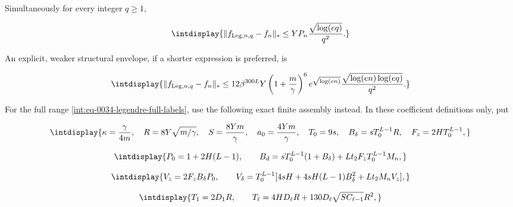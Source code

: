
Simultaneously for every integer \(q\ge1\),


\begingroup\renewcommand{\theHequation}{intdisplay.121}
\begin{equation}
\intdisplay{
\|f_{{\rm Leg},n,q}-f_n\|_*
\le YP_n\frac{\sqrt{\log(eq)}}{q^2}.
}
\label{int:eq-0040-legendre-simple-forward}
\end{equation}
\endgroup


An explicit, weaker structural envelope, if a shorter expression is preferred, is


\begingroup\renewcommand{\theHequation}{intdisplay.122}
\begin{equation}
\intdisplay{
\|f_{{\rm Leg},n,q}-f_n\|_*
\le12\beta^{300L}Y\left(1+\frac m\gamma\right)^6
e^{\sqrt{\log(en)}}
\frac{\sqrt{\log(en)\log(eq)}}{q^2}.
}
\label{int:eq-0041-legendre-structural-forward}
\end{equation}
\endgroup


For the full range \eqref{int:eq-0034-legendre-full-labels}, use the following exact finite assembly instead. In these coefficient definitions only, put


\begingroup\renewcommand{\theHequation}{intdisplay.123}
\begin{equation*}
\intdisplay{
\kappa=\frac\gamma{4m},\quad
R=8Y\sqrt{m/\gamma},\quad S=\frac{8Ym}\gamma,
\quad a_0=\frac{4Ym}\gamma,\quad T_0=9s,
\quad B_\delta=sT_0^{L-1}R,\quad F_z=2HT_0^{L-1},
}
\end{equation*}
\endgroup

\begingroup\renewcommand{\theHequation}{intdisplay.124}
\begin{equation*}
\intdisplay{
P_0=1+2H(L-1),\qquad
B_d=sT_0^{L-1}(1+B_\delta)+Lt_2F_zT_0^{L-1}M_n,
}
\end{equation*}
\endgroup

\begingroup\renewcommand{\theHequation}{intdisplay.125}
\begin{equation*}
\intdisplay{
V_z=2F_zB_\delta P_0,\qquad
V_\delta=T_0^{L-1}
[4sH+4sH(L-1)B_\delta^2+Lt_2M_nV_z],
}
\end{equation*}
\endgroup

\begingroup\renewcommand{\theHequation}{intdisplay.126}
\begin{equation*}
\intdisplay{
T_1=2D_1R,\qquad
T_\ell=4HD_\ell R+130D_\ell\sqrt{SC_{\ell-1}}R^2,
}
\end{equation*}
\endgroup


